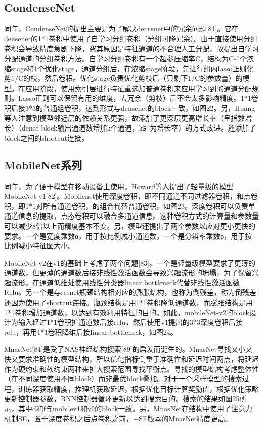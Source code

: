 \documentclass[15pt]{article}
\begin{document}
\subsection{CondenseNet}
同年，CondenseNet的提出主要是为了解决densenet中的冗余问题[81]。它在densenet的1*1卷积中使用了自学习分组卷积（分组可降冗余）。由于直接使用分组卷积会导致精度急剧下降，究其原因是特征通道的不合理人工分配，故提出自学习分配通道的分组卷积方法。自学习分组卷积有一个超参压缩率C，结构为C-1个浓缩stage和1个优化stage。通道分组后，在浓缩stage阶段，先进行组内lasso正则化剪1/C的枝，然后卷积。优化stage负责优化剪枝后（只剩下1/C的参数量）的模型。在应用阶段，使用索引层进行特征重选加普通卷积来应用学习到的通道分配规则。Lasso正则可以保留有用的维度，去冗余（剪枝）后不会太多影响精度。1*1卷积后接3*3的普通组卷积，达到形式与densenet的block一致，如图22。另，Huang等人注意到模型邻近层的依赖关系更强，故添加了更深层更高增长率（呈指数增长）（dense block输出通道数增加k个通道，k即为增长率）的方式改进。还添加了block之间的shortcut连接。

\subsection{MobileNet系列}
同年，为了便于模型在移动设备上使用，Howard等人提出了轻量级的模型MobileNet-v1[82]。Mobilenet使用深度卷积，即不同通道不同过滤器卷积，和点卷积，即1*1对所有通道卷积，的组合代替普通卷积，如图23。深度卷积可以负责单通道信息的提取，点态卷积可以融合多通道信息。这种卷积方式的计算量和参数量可以减少8倍以上而精度基本不变。另，模型还提出了两个参数以应对更小更快的要求。一个是宽度乘数α，用于按比例减小通道数，一个是分辨率乘数ρ，用于按比例减小特征图大小。

MobileNet-v2在v1的基础上考虑了两个问题[83]。一个是轻量级模型要求了更薄的通道数，但更薄的通道数后接非线性激活函数会导致兴趣流形的坍塌，为了保留兴趣流形，在通道低维处使用线性分类器linear bottleneck代替非线性激活函数Relu。另一个是与resnet瓶颈结构相对应的膨胀结构，也称为倒残差，称为倒残差还因为使用了shortcut连接。瓶颈结构是用1*1卷积降低通道数，而膨胀结构是用1*1卷积增加通道数，以达到有效利用特征的目的。如此，mobileNet-v2的block设计为输入经过1*1卷积扩通道数后接relu，然后使用v1提出的3*3深度卷积后接relu，再用1*1卷积降维后接linear bottleneck，如图24。

MnasNet[84]是受了NAS神经结构搜索[89]的启发而诞生的。MnasNet寻找又小又快又要求准确性的模型结构，所以优化指标侧重于准确性和延迟时间两点，将延迟作为硬约束和软约束两种来扩大搜索范围寻找平衡点。寻找的模型结构考虑整体性（在不同深度使用不同block）而非最优block叠加。对于一个采样模型的搜索过程，训练器获取精度，推理机获取延迟，根据优化目标计算奖励值，根据优化策略更新控制器参数，RNN控制器循环更新以达到搜索目的。搜索的结果如图25所示，其中d和f与mobilev1和v2的block一致。另，MnasNet在结构中使用了注意力机制SE，置于深度卷积之后点卷积之前，+SE版本的MnasNet精度更高。
\end{document}

